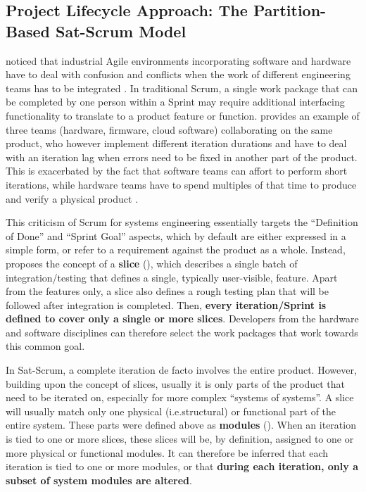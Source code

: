 \documentclass[a4paper,nobib,justified,final]{tufte-book}
\begin{document}
\FloatBarrier
\subsection{Project Lifecycle Approach: The Partition-Based Sat-Scrum Model}
\label{sec:METHODOLOGY_slicebased}
\label{sec:METHODOLOGY_partitions}

\citeauthor{iberleAgileGetsPhysical2022} noticed that industrial Agile environments incorporating software and hardware have to deal with confusion and conflicts when the work of different engineering teams has to be integrated \autocite{iberleAgileGetsPhysical2022}. In traditional Scrum, a single work package that can be completed by one person within a Sprint may require additional interfacing functionality to translate to a product feature or function. \citeauthor{iberleAgileGetsPhysical2022} provides an example of three teams (hardware, firmware, cloud software) collaborating on the same product, who however implement different iteration durations and have to deal with an iteration lag when errors need to be fixed in another part of the product. This is exacerbated by the fact that software teams can affort to perform short iterations, while hardware teams have to spend multiples of that time to produce and verify a physical product \autocite{cooperAgileDevelopmentManufacturing2023}. 

This criticism of Scrum for systems engineering essentially targets the ``Definition of Done'' and ``Sprint Goal'' aspects, which by default are either expressed in a simple form, or refer to a requirement against the product as a whole. Instead, \citeauthor{iberleAgileGetsPhysical2022} proposes the concept of a \textbf{slice} (), which describes a single batch of integration/testing that defines a single, typically user-visible, feature. Apart from the features only, a slice also defines a rough testing plan that will be followed after integration is completed. Then, \textbf{every iteration/Sprint is defined to cover only a single or more slices}. Developers from the hardware and software disciplines can therefore select the work packages that work towards this common goal.


In Sat-Scrum, a complete iteration de facto involves the entire product. However, building upon the concept of slices, usually it is only parts of the product that need to be iterated on, especially for more complex ``systems of systems''. A slice will usually match only one physical (i.e.\@ structural) or functional part of the entire system. These parts were defined above as \textbf{modules} (). When an iteration is tied to one or more slices, these slices will be, by definition, assigned to one or more physical or functional modules. It can therefore be inferred that each iteration is tied to one or more modules, or that \textbf{during each iteration, only a subset of system modules are altered}.
\end{document}
